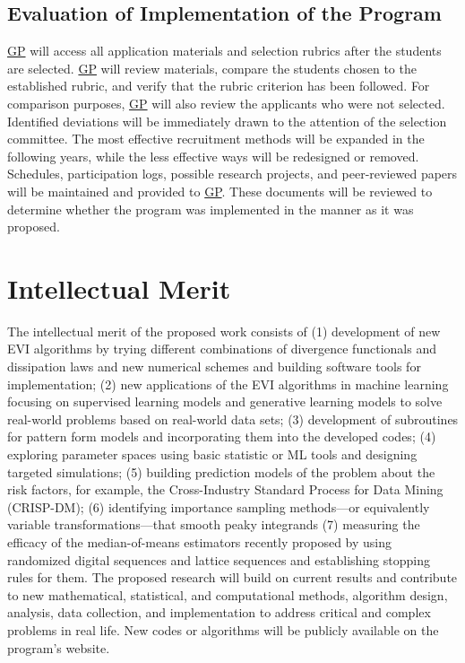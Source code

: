 \documentclass[11pt]{NSFamsart}
\newcommand{\GP}{\hyperlink{GPlink}{GP}\xspace}
\begin{document}
\subsection{Evaluation of Implementation of the Program}
\GP will access all application materials and selection rubrics after the students are selected. \GP will review materials, compare the students chosen to the established rubric, and verify that the rubric criterion has been followed. For comparison purposes, \GP will also
review the applicants who were not selected. Identified deviations will be immediately drawn to the attention of the selection committee. The most effective recruitment methods will be expanded in the following years, while the less effective ways will be redesigned or removed. Schedules, participation logs, possible research projects, and peer-reviewed papers will be maintained and provided to \GP. These documents will be reviewed to determine whether the program was implemented in the manner as it was proposed.

 
\section{Intellectual Merit}
The intellectual merit of the proposed work consists of (1) development of new EVI algorithms by trying different combinations of divergence functionals and dissipation laws and new numerical schemes and building software tools for implementation; (2) new applications of the EVI algorithms in machine learning focusing on supervised learning models and generative learning models to solve real-world problems based on real-world data sets; (3) development of subroutines for pattern form models and incorporating them into the developed codes; 
(4) 
exploring parameter spaces using basic statistic or ML tools and designing targeted simulations; 
(5) building prediction models of the problem about the risk factors, for example, the Cross-Industry Standard Process for Data Mining (CRISP-DM); (6) identifying importance sampling methods—or equivalently variable transformations—that smooth
peaky integrands (7) measuring the efficacy of the median-of-means estimators recently proposed by using randomized digital sequences and lattice sequences and establishing stopping rules for them. The proposed research will build on current results and contribute to new mathematical, statistical, and computational methods, algorithm design, analysis, data collection, and implementation to address critical and complex problems in real life. New codes or algorithms will be publicly available on the program’s website.
\end{document}
